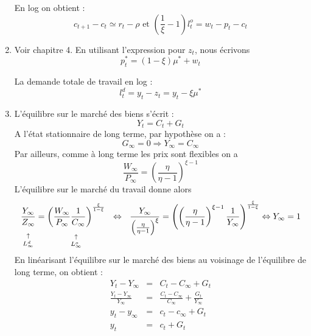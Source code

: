 \documentclass[a4paper,11pt]{article}
\begin{document}
\begin{enumerate}
En log on obtient :%
\begin{equation*}
c_{t+1}-c_{t}\simeq r_{t}-\rho \text{ \ et \ }\left( \frac{1}{\xi }-1\right)
l_{t}^{o}=w_{t}-p_{t}-c_{t}
\end{equation*}


\item Voir chapitre 4. En utilisant l'expression pour $ z_t $, nous écrivons
\begin{equation*}
p_{t}^{\ast }=\left( 1-\xi \right) \mu ^{\ast }+w_{t}
\end{equation*}%

La demande totale de travail en log :%
\begin{equation*}
l_{t}^{d}=y_{t}-z_{t}=y_{t}-\xi \mu ^{\ast }
\end{equation*}

\item L'\'{e}quilibre sur le march\'{e} des biens s'\'{e}crit :%
\begin{equation*}
Y_{t}=C_{t}+G_{t}
\end{equation*}%
A l'\'{e}tat stationnaire de long terme, par hypoth\`{e}se on a :%
\begin{equation*}
G_{\infty }=0\Rightarrow Y_{\infty }=C_{\infty }
\end{equation*}%
Par ailleurs, comme \`{a} long terme les prix sont flexibles on a%
\begin{equation*}
\frac{W_{\infty }}{P_{\infty }}=\left( \frac{\eta }{\eta -1}\right) ^{\xi -1}
\end{equation*}%
L'\'{e}quilibre sur le march\'{e} du travail donne alors 
\begin{equation*}
\underset{L_{\infty }^{d}}{\underset{\uparrow }{\underset{}{\frac{Y_{\infty }%
}{Z_{\infty }}}}}=\underset{L_{\infty }^{o}}{\underset{\uparrow }{\underset{}%
{\left( \frac{W_{\infty }}{P_{\infty }}\frac{1}{C_{\infty }}\right) ^{\frac{%
\xi }{1-\xi }}}}}\ \ \Leftrightarrow \ \ \frac{Y_{\infty }}{\left( \frac{%
\eta }{\eta -1}\right) ^{\xi }}=\left( \left( \frac{\eta }{\eta -1}\right)
^{\xi -1}\frac{1}{Y_{\infty }}\right) ^{\frac{\xi }{1-\xi }}\Leftrightarrow
Y_{\infty }=1
\end{equation*}%
En lin\'{e}arisant l'\'{e}quilibre sur le march\'{e} des biens au voisinage
de l'\'{e}quilibre de long terme, on obtient :%
\begin{eqnarray*}
Y_{t}-Y_{\infty } &=&C_{t}-C_{\infty }+G_{t} \\
\frac{Y_{t}-Y_{\infty }}{Y_{\infty }} &=&\frac{C_{t}-C_{\infty }}{C_{\infty }%
}+\frac{G_{t}}{Y_{\infty }} \\
y_{t}-y_{\infty } &=&c_{t}-c_{\infty }+G_{t} \\
y_{t} &=&c_{t}+G_{t}
\end{eqnarray*}


\end{enumerate}
\end{document}
